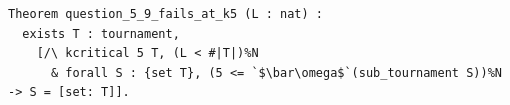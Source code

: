 \begin{lstlisting}[language=Rocq]
Theorem question_5_9_fails_at_k5 (L : nat) :
  exists T : tournament,
    [/\ kcritical 5 T, (L < #|T|)%N
      & forall S : {set T}, (5 <= `$\bar\omega$`(sub_tournament S))%N -> S = [set: T]].
\end{lstlisting}
